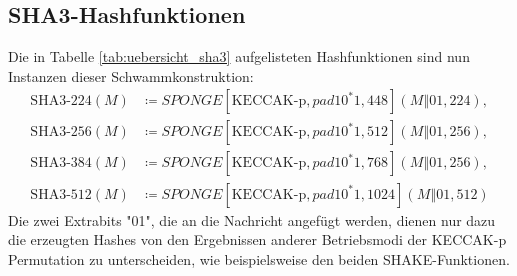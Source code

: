 \subsection{SHA3-Hashfunktionen}
\label{cha:definition_sha3}
Die in Tabelle \ref{tab:uebersicht_sha3} aufgelisteten Hashfunktionen sind nun Instanzen dieser Schwammkonstruktion:
\begin{align*}
	\text{SHA3-224}(M) & \coloneq SPONGE[\text{KECCAK-p},pad10^*1, 448](M \mathbin\Vert 01, 224), \\
	\text{SHA3-256}(M) & \coloneq SPONGE[\text{KECCAK-p},pad10^*1, 512](M \mathbin\Vert 01, 256), \\
	\text{SHA3-384}(M) & \coloneq SPONGE[\text{KECCAK-p},pad10^*1, 768](M \mathbin\Vert 01, 256), \\
	\text{SHA3-512}(M) & \coloneq SPONGE[\text{KECCAK-p},pad10^*1,1024](M \mathbin\Vert 01, 512)
\end{align*}
Die zwei Extrabits "01", die an die Nachricht angefügt werden,
dienen nur dazu die erzeugten Hashes von den Ergebnissen anderer Betriebsmodi der KECCAK-p Permutation zu unterscheiden,
wie beispielsweise den beiden SHAKE-Funktionen.

